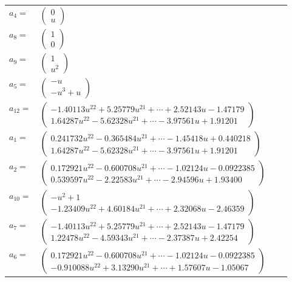 \documentclass[1p]{elsarticle_modified}
\theoremstyle{definition}
\begin{document}
\begin{tabular}{m{7pt} m{180pt} m{7pt} m{180pt} }
\flushright $a_{4}=$&$\begin{pmatrix}0\\u\end{pmatrix}$ \\
\flushright $a_{8}=$&$\begin{pmatrix}1\\0\end{pmatrix}$ \\
\flushright $a_{9}=$&$\begin{pmatrix}1\\u^2\end{pmatrix}$ \\
\flushright $a_{5}=$&$\begin{pmatrix}- u\\- u^3+u\end{pmatrix}$ \\
\flushright $a_{12}=$&$\begin{pmatrix}-1.40113 u^{22}+5.25779 u^{21}+\cdots+2.52143 u-1.47179\\1.64287 u^{22}-5.62328 u^{21}+\cdots-3.97561 u+1.91201\end{pmatrix}$ \\
\flushright $a_{1}=$&$\begin{pmatrix}0.241732 u^{22}-0.365484 u^{21}+\cdots-1.45418 u+0.440218\\1.64287 u^{22}-5.62328 u^{21}+\cdots-3.97561 u+1.91201\end{pmatrix}$ \\
\flushright $a_{2}=$&$\begin{pmatrix}0.172921 u^{22}-0.600708 u^{21}+\cdots-1.02124 u-0.0922385\\0.539597 u^{22}-2.22583 u^{21}+\cdots-2.94596 u+1.93400\end{pmatrix}$ \\
\flushright $a_{10}=$&$\begin{pmatrix}- u^2+1\\-1.23409 u^{22}+4.60184 u^{21}+\cdots+2.32068 u-2.46359\end{pmatrix}$ \\
\flushright $a_{7}=$&$\begin{pmatrix}-1.40113 u^{22}+5.25779 u^{21}+\cdots+2.52143 u-1.47179\\1.22478 u^{22}-4.59343 u^{21}+\cdots-2.37387 u+2.42254\end{pmatrix}$ \\
\flushright $a_{6}=$&$\begin{pmatrix}0.172921 u^{22}-0.600708 u^{21}+\cdots-1.02124 u-0.0922385\\-0.910088 u^{22}+3.13290 u^{21}+\cdots+1.57607 u-1.05067\end{pmatrix}$ \\

\end{tabular}
\end{document}
